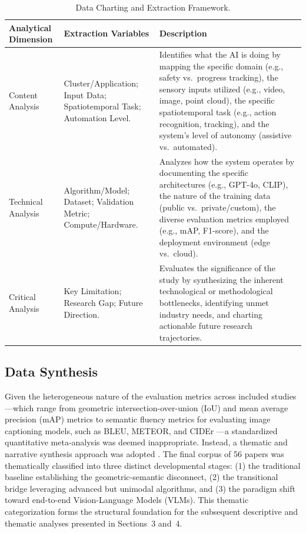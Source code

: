 \documentclass[10pt,letterpaper]{article}
\begin{document}
\begin{table}[H]
\caption{Data Charting and Extraction Framework.}
\label{tab:charting}
\small
{}
\begin{tabularx}{\textwidth}{L{2.6cm} L{4.5cm} Y}
\toprule
{}
\textbf{Analytical Dimension} & \textbf{Extraction Variables} & \textbf{Description}\\
\midrule
Content Analysis & Cluster/Application; Input Data; Spatiotemporal Task; Automation Level. & Identifies what the AI is doing by mapping the specific domain (e.g., safety vs.\ progress tracking), the sensory inputs utilized (e.g., video, image, point cloud), the specific spatiotemporal task (e.g., action recognition, tracking), and the system's level of autonomy (assistive vs.\ automated).\\
Technical Analysis & Algorithm/Model; Dataset; Validation Metric; Compute/Hardware. & Analyzes how the system operates by documenting the specific architectures (e.g., GPT-4o, CLIP), the nature of the training data (public vs.\ private/custom), the diverse evaluation metrics employed (e.g., mAP, F1-score), and the deployment environment (edge vs.\ cloud).\\
Critical Analysis & Key Limitation; Research Gap; Future Direction. & Evaluates the significance of the study by synthesizing the inherent technological or methodological bottlenecks, identifying unmet industry needs, and charting actionable future research trajectories.\\
\bottomrule
\end{tabularx}
\end{table}

\subsection{Data Synthesis}

Given the heterogeneous nature of the evaluation metrics across included studies---which range from geometric intersection-over-union (IoU) and mean average precision (mAP) metrics \cite{nath2020,wang2024} to semantic fluency metrics for evaluating image captioning models, such as BLEU, METEOR, and CIDEr \cite{jung2024,xiao2022}---a standardized quantitative meta-analysis was deemed inappropriate. Instead, a thematic and narrative synthesis approach was adopted \cite{tricco2018}. The final corpus of 56 papers was thematically classified into three distinct developmental stages: (1) the traditional baseline establishing the geometric-semantic disconnect, (2) the transitional bridge leveraging advanced but unimodal algorithms, and (3) the paradigm shift toward end-to-end Vision-Language Models (VLMs). This thematic categorization forms the structural foundation for the subsequent descriptive and thematic analyses presented in Sections~3 and~4.
\end{document}
